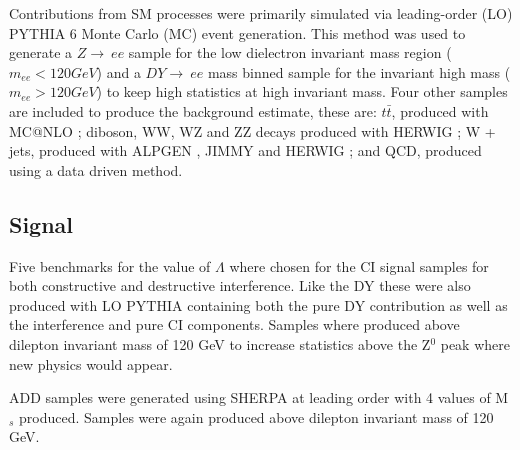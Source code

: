 	Contributions from SM processes were primarily simulated via leading-order (LO) PYTHIA 6 \cite{} Monte Carlo (MC) event generation. This method was used to generate a $Z\rightarrow~ee$ sample for the low dielectron invariant mass region ($m_{ee} < 120 GeV$) and a $DY\rightarrow~ee$ mass binned sample for the invariant high mass ($m_{ee} > 120 GeV$) to keep high statistics at high invariant mass. Four other samples are included to produce the background estimate, these are: $t\bar{t}$, produced with MC@NLO \cite{}; diboson, WW, WZ and ZZ decays produced with HERWIG \cite{}; W + jets, produced with ALPGEN \cite{}, JIMMY \cite{} and HERWIG \cite{}; and QCD, produced using a data driven method.

\subsection*{Signal} 

	Five benchmarks for the value of $\Lambda$ where chosen for the CI signal samples for both constructive and destructive interference. Like the DY these were also produced with LO PYTHIA containing both the pure DY contribution as well as the interference and pure CI components. Samples where produced above dilepton invariant mass of 120 GeV to increase statistics above the Z$^{0}$ peak where new physics would appear. 

	ADD samples were generated using SHERPA \cite{} at leading order with 4 values of M$_{s}$ produced. Samples were again produced above dilepton invariant mass of 120 GeV. 

